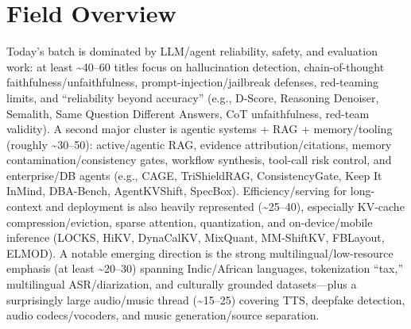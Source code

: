 \documentclass[12pt,letterpaper]{article}
\begin{document}
\medskip



\section*{Field Overview}
{\footnotesize Today's batch is dominated by LLM/agent reliability, safety, and evaluation work: at least \textasciitilde{}40--60 titles focus on hallucination detection, chain-of-thought faithfulness/unfaithfulness, prompt-injection/jailbreak defenses, red-teaming limits, and ``reliability beyond accuracy'' (e.g., D-Score, Reasoning Denoiser, Semalith, Same Question Different Answers, CoT unfaithfulness, red-team validity). A second major cluster is agentic systems + RAG + memory/tooling (roughly \textasciitilde{}30--50): active/agentic RAG, evidence attribution/citations, memory contamination/consistency gates, workflow synthesis, tool-call risk control, and enterprise/DB agents (e.g., CAGE, TriShieldRAG, ConsistencyGate, Keep It InMind, DBA-Bench, AgentKVShift, SpecBox). Efficiency/serving for long-context and deployment is also heavily represented (\textasciitilde{}25--40), especially KV-cache compression/eviction, sparse attention, quantization, and on-device/mobile inference (LOCKS, HiKV, DynaCalKV, MixQuant, MM-ShiftKV, FBLayout, ELMOD). A notable emerging direction is the strong multilingual/low-resource emphasis (at least \textasciitilde{}20--30) spanning Indic/African languages, tokenization ``tax,'' multilingual ASR/diarization, and culturally grounded datasets---plus a surprisingly large audio/music thread (\textasciitilde{}15--25) covering TTS, deepfake detection, audio codecs/vocoders, and music generation/source separation.}
\end{document}
